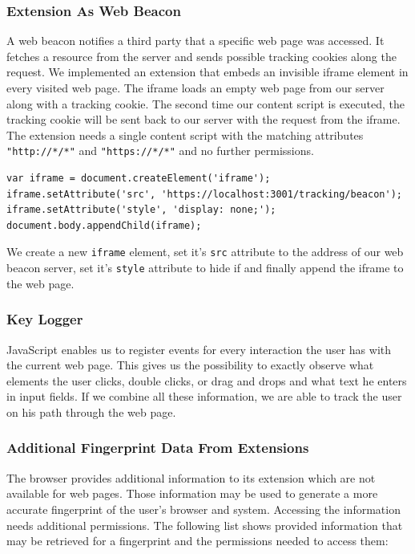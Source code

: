 \documentclass[article,colorback,accentcolor=tud9c,type=bsc]{tudthesis}
\let\stdsubsubsection\subsubsection
\renewcommand\subsubsection{\newpage\stdsubsubsection}
\begin{document}
\subsubsection{Extension As Web Beacon}
	
	A web beacon notifies a third party that a specific web page was accessed. It fetches a resource from the server and sends possible tracking cookies along the request. We implemented an extension that embeds an invisible iframe element in every visited web page. The iframe loads an empty web page from our server along with a tracking cookie. The second time our content script is executed, the tracking cookie will be sent back to our server with the request from the iframe. The extension needs a single content script with the matching attributes \texttt{"http://*/*"} and \texttt{"https://*/*"} and no further permissions.
	
	\begin{lstlisting}
var iframe = document.createElement('iframe');
iframe.setAttribute('src', 'https://localhost:3001/tracking/beacon');
iframe.setAttribute('style', 'display: none;');
document.body.appendChild(iframe);
	\end{lstlisting}
	
	We create a new \texttt{iframe} element, set it's \texttt{src} attribute to the address of our web beacon server, set it's \texttt{style} attribute to hide if and finally append the iframe to the web page. 
	
\subsubsection{Key Logger}
	
	JavaScript enables us to register events for every interaction the user has with the current web page. This gives us the possibility to exactly observe what elements the user clicks, double clicks, or drag and drops and what text he enters in input fields. If we combine all these information, we are able to track the user on his path through the web page. 
	
	
\subsubsection{Additional Fingerprint Data From Extensions}
	
	The browser provides additional information to its extension which are not available for web pages. Those information may be used to generate a more accurate fingerprint of the user's browser and system. Accessing the information needs additional permissions. The following list shows provided information that may be retrieved for a fingerprint and the permissions needed to access them: \\
	
\end{document}
